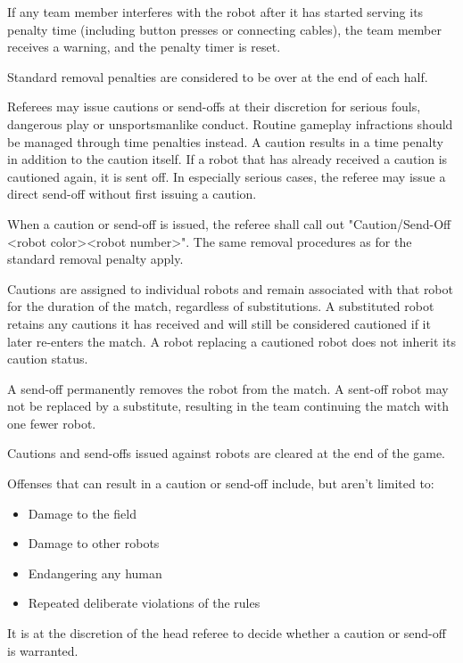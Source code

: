 If any team member interferes with the robot after it has started serving its penalty time (including button presses or connecting cables), the team member receives a warning, and the penalty timer is reset.

Standard removal penalties are considered to be over at the end of each half.

\label{sec:caution_sendoff}
Referees may issue cautions or send-offs at their discretion for serious fouls, dangerous play or unsportsmanlike conduct. Routine gameplay infractions should be managed through time penalties instead.
A caution results in a time penalty in addition to the caution itself. If a robot that has already received a caution is cautioned again, it is sent off. In especially serious cases, the referee may issue a direct send-off without first issuing a caution.

When a caution or send-off is issued, the referee shall call out "Caution/Send-Off \textless robot color\textgreater \textless robot number\textgreater". The same removal procedures as for the standard removal penalty apply.

Cautions are assigned to individual robots and remain associated with that robot for the duration of the match, regardless of substitutions. A substituted robot retains any cautions it has received and will still be considered cautioned if it later re-enters the match. A robot replacing a cautioned robot does not inherit its caution status.

A send-off permanently removes the robot from the match. A sent-off robot may not be replaced by a substitute, resulting in the team continuing the match with one fewer robot.

Cautions and send-offs issued against robots are cleared at the end of the game.

Offenses that can result in a caution or send-off include, but aren't limited to:

\begin{itemize}
	\item Damage to the field
	\item Damage to other robots
	\item Endangering any human
	\item Repeated deliberate violations of the rules
\end{itemize}

It is at the discretion of the head referee to decide whether a caution or send-off is warranted.

